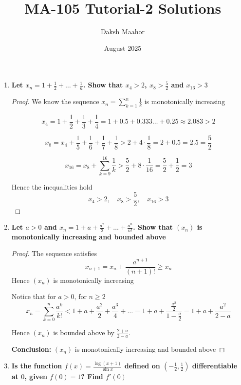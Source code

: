 \documentclass[14pt]{extarticle}
\title{MA-105 Tutorial-2 Solutions}
\author{Daksh Maahor}
\date{August 2025}
\begin{document}
\maketitle

\begin{enumerate}

\item \textbf{Let $x_n = 1 + \frac12 + \dots + \frac1n$. Show that $x_4 > 2$, $x_8 > \frac{5}{2}$ and $x_{16} > 3$}

\begin{proof}
We know the sequence $x_n = \sum_{k=1}^n \frac{1}{k}$ is monotonically increasing

\medskip
\[
x_4 = 1 + \frac12 + \frac13 + \frac14 = 1 + 0.5 + 0.333\ldots + 0.25 \approx 2.083 > 2
\]

\medskip
\[
x_8 = x_4 + \frac15 + \frac16 + \frac17 + \frac18 > 2 + 4 \cdot \frac18 = 2 + 0.5 = 2.5 = \frac{5}{2}
\]

\medskip
\[
x_{16} = x_8 + \sum_{k=9}^{16} \frac1k > \frac{5}{2} + 8 \cdot \frac{1}{16} = \frac{5}{2} + \frac12 = 3
\]

Hence the inequalities hold
\[
x_4>2,\quad x_8 > \frac{5}{2},\quad x_{16} > 3
\]
\end{proof}

\newpage
\item \textbf{Let $a>0$ and $x_n = 1 + a + \frac{a^2}{2} + \dots + \frac{a^n}{n!}$. Show that $(x_n)$ is monotonically increasing and bounded above}

\begin{proof}

The sequence satisfies 
\[
x_{n+1} = x_n + \frac{a^{n+1}}{(n+1)!} \ge x_n
\]
Hence $(x_n)$ is monotonically increasing

\medskip

Notice that for $a>0$, for $n \geq 2$
\[
x_n = \sum_{k=0}^{n} \frac{a^k}{k!} < 1 + a + \frac{a^2}{2} + \frac{a^3}{4} + \dots = 1 + a + \frac{\frac{a^2}{2}}{1-\frac{a}{2}} = 1+a+\frac{a^2}{2-a}
\]

Hence $(x_n)$ is bounded above by $\frac{2+a}{2-a}$.

\medskip
\textbf{Conclusion:} $(x_n)$ is monotonically increasing and bounded above
\end{proof}

\newpage
\item \textbf{Is the function $f(x) = \frac{\log(x+1)}{\sin x}$ defined on $\left(-\frac12, \frac12\right)$ differentiable at $0$, given $f(0) = 1$? Find $f'(0)$}


\end{enumerate}
\end{document}
